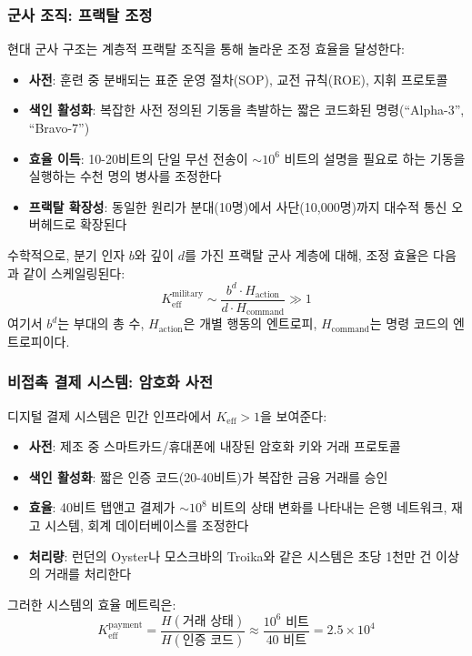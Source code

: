 \documentclass[11pt,a4paper]{article}
\begin{document}
	\subsubsection{군사 조직: 프랙탈 조정}
	현대 군사 구조는 계층적 프랙탈 조직을 통해 놀라운 조정 효율을 달성한다:
	\begin{itemize}
		\item \textbf{사전}: 훈련 중 분배되는 표준 운영 절차(SOP), 교전 규칙(ROE), 지휘 프로토콜
		\item \textbf{색인 활성화}: 복잡한 사전 정의된 기동을 촉발하는 짧은 코드화된 명령(``Alpha-3'', ``Bravo-7'')
		\item \textbf{효율 이득}: 10-20비트의 단일 무선 전송이 $\sim 10^6$ 비트의 설명을 필요로 하는 기동을 실행하는 수천 명의 병사를 조정한다
		\item \textbf{프랙탈 확장성}: 동일한 원리가 분대(10명)에서 사단(10,000명)까지 대수적 통신 오버헤드로 확장된다
	\end{itemize}
	
	수학적으로, 분기 인자 $b$와 깊이 $d$를 가진 프랙탈 군사 계층에 대해, 조정 효율은 다음과 같이 스케일링된다:
	\begin{equation}
		K_{\mathrm{eff}}^{\text{military}} \sim \frac{b^d \cdot H_{\text{action}}}{d \cdot H_{\text{command}}} \gg 1
	\end{equation}
	여기서 $b^d$는 부대의 총 수, $H_{\text{action}}$은 개별 행동의 엔트로피, $H_{\text{command}}$는 명령 코드의 엔트로피이다.
	
	\subsubsection{비접촉 결제 시스템: 암호화 사전}
	디지털 결제 시스템은 민간 인프라에서 $K_{\mathrm{eff}} > 1$을 보여준다:
	\begin{itemize}
		\item \textbf{사전}: 제조 중 스마트카드/휴대폰에 내장된 암호화 키와 거래 프로토콜
		\item \textbf{색인 활성화}: 짧은 인증 코드(20-40비트)가 복잡한 금융 거래를 승인
		\item \textbf{효율}: 40비트 탭앤고 결제가 $\sim 10^8$ 비트의 상태 변화를 나타내는 은행 네트워크, 재고 시스템, 회계 데이터베이스를 조정한다
		\item \textbf{처리량}: 런던의 Oyster나 모스크바의 Troika와 같은 시스템은 초당 1천만 건 이상의 거래를 처리한다
	\end{itemize}
	
	그러한 시스템의 효율 메트릭은:
	\begin{equation}
		K_{\mathrm{eff}}^{\text{payment}} = \frac{H(\text{거래 상태})}{H(\text{인증 코드})} \approx \frac{10^6 \text{ 비트}}{40 \text{ 비트}} = 2.5 \times 10^4
	\end{equation}
	
\end{document}
